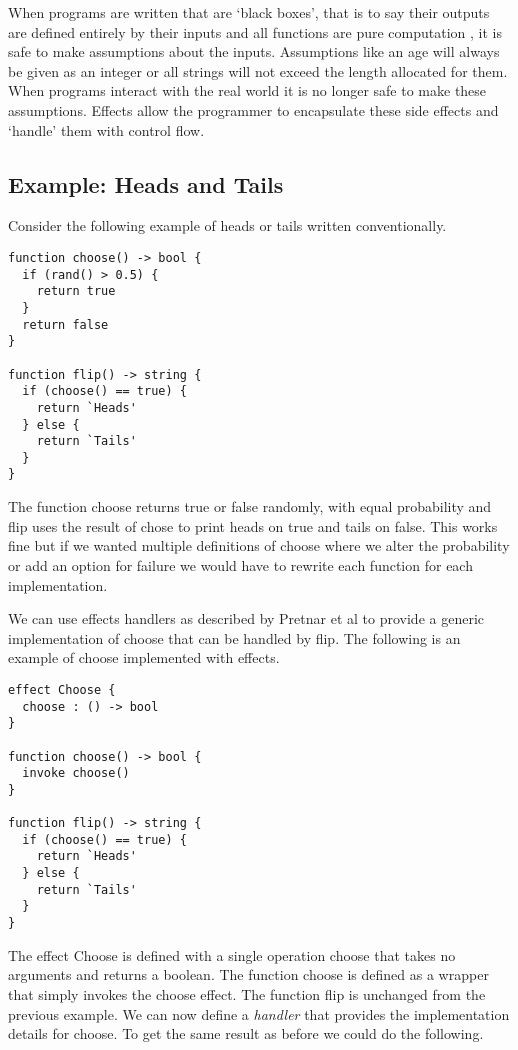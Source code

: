 \documentclass[logo,bsc,singlespacing,parskip]{infthesis}
\begin{document}
When programs are written that are `black boxes', that is to say their outputs
are defined entirely by their inputs and all functions are pure computation
\cite{hughes1989functional}, it is safe to make assumptions about the inputs.
Assumptions like an age will always be given as an integer or all strings will
not exceed the length allocated for them. When programs interact with the real
world it is no longer safe to make these assumptions. Effects allow the
programmer to encapsulate these side effects and `handle' them with control
flow. 

\subsection{Example: Heads and Tails}

Consider the following example of heads or tails written
conventionally.

\begin{lstlisting}
function choose() -> bool {
  if (rand() > 0.5) {
    return true
  }
  return false
}

function flip() -> string {
  if (choose() == true) {
    return `Heads'
  } else {
    return `Tails'
  }
}
\end{lstlisting}

The function choose returns true or false randomly, with equal probability and
flip uses the result of chose to print heads on true and tails on false. This
works fine but if we wanted multiple definitions of choose where we alter the
probability or add an option for failure we would have to rewrite each function
for each implementation.

We can use effects handlers as described by Pretnar et al
\cite{pretnar2015introduction} to provide a generic implementation of choose
that can be handled by flip. The following is an example of choose implemented
with effects.

\begin{lstlisting}
effect Choose {
  choose : () -> bool
}

function choose() -> bool {
  invoke choose()
}

function flip() -> string {
  if (choose() == true) {
    return `Heads'
  } else {
    return `Tails'
  }
}
\end{lstlisting}

The effect Choose is defined with a single operation choose that takes no
arguments and returns a boolean. The function choose is defined as a wrapper
that simply invokes the choose effect. The function flip is unchanged from the
previous example. We can now define a \emph{handler} that provides the
implementation details for choose. To get the same result as before we could do
the following.
\end{document}
